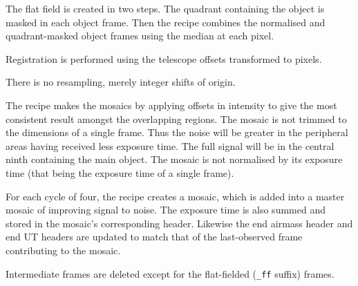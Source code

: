 \documentclass[twoside,11pt,nolof]{starlink}
\begin{document}
{{{         \sstitem
         The flat field is created in two steps.  The quadrant
         containing the object is masked in each object frame.  Then the
         recipe combines the normalised and quadrant-masked object frames
         using the median at each pixel.

         \sstitem
         Registration is performed using the telescope offsets
         transformed to pixels.

         \sstitem
         There is no resampling, merely integer shifts of origin.

         \sstitem
         The recipe makes the mosaics by applying offsets in intensity
         to give the most consistent result amongst the overlapping regions.
         The mosaic is not trimmed to the dimensions of a single frame.  Thus
         the noise will be greater in the peripheral areas having received
         less exposure time.  The full signal will be in the central ninth
         containing the main object.  The mosaic is not normalised by its
         exposure time (that being the exposure time of a single frame).

         \sstitem
         For each cycle of four, the recipe creates a mosaic, which is
         added into a master mosaic of improving signal to noise.  The
         exposure time is also summed and stored in the mosaic's
	 corresponding header.  Likewise the end airmass header and
	 end UT headers are updated to match that of the last-observed
	 frame contributing to the mosaic.

         \sstitem
         Intermediate frames are deleted except for the flat-fielded ({\tt\_ff}
         suffix) frames.
      }
   }
   }
\end{document}
